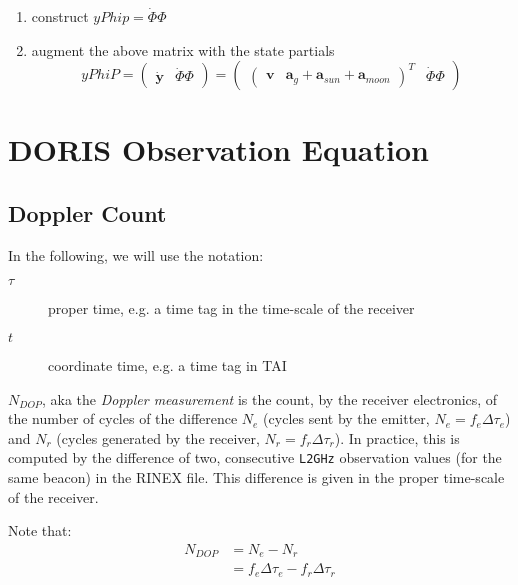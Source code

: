 \begin{enumerate}
    \item construct $yPhip = \dot{\Phi} \Phi$
    
    \item augment the above matrix with the state partials 
        \begin{equation}
            yPhiP = 
            \begin{pmatrix} 
                \dot{\bm{y}} & \dot{\Phi} \Phi 
            \end{pmatrix}  = 
            \begin{pmatrix} 
                \begin{pmatrix} \bm{v} & \bm{a}_g + \bm{a}_{sun} + \bm{a}_{moon} \end{pmatrix}^T 
                & \dot{\Phi} \Phi
            \end{pmatrix}
        \end{equation}
\end{enumerate}

\section{DORIS Observation Equation}
\label{sec:doris-observation-equation}

\subsection{Doppler Count}
\label{ssec:doppler-count}
In the following, we will use the notation:
\begin{description}
  \item[$\tau$] proper time, e.g. a time tag in the time-scale of the receiver
  \item[$t$] coordinate time, e.g. a time tag in TAI
\end{description}

$N_{DOP}$, aka the \emph{Doppler measurement} is the count, by the receiver 
electronics, of the number of cycles of the difference $N_e$ (cycles sent by the 
emitter, $N_e=f_e \Delta \tau_e$) and $N_r$ (cycles generated by the receiver, 
$N_r=f_r \Delta \tau_r$). In practice, this is computed by the difference of two, 
consecutive \texttt{L2GHz} observation values (for the same beacon) in the 
RINEX file. This difference is given in the proper time-scale of the receiver.

Note that:
\begin{equation}
  \begin{split}
    N_{DOP} & = N_e - N_r\\
            & = f_e \Delta\tau_e - f_r \Delta\tau_r
  \end{split}
\end{equation}

